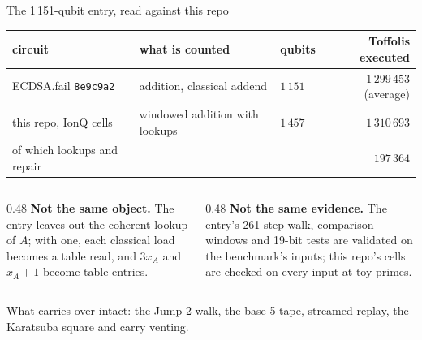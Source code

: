 \documentclass[aspectratio=169,11pt]{beamer}
\begin{document}
\begin{frame}{The 1\,151-qubit entry, read against this repo}
  \centering\footnotesize
  \renewcommand{\arraystretch}{1.15}
  \begin{tabular}{@{}lllr@{}}
    \toprule
    circuit & what is counted & qubits & Toffolis executed \\
    \midrule
    ECDSA.fail \texttt{8e9c9a2} & addition, classical addend & $1\,151$ & $1\,299\,453$ (average) \\
    this repo, IonQ cells & windowed addition with lookups & $1\,457$ & $1\,310\,693$ \\
    \quad of which lookups and repair & & & $197\,364$ \\
    \bottomrule
  \end{tabular}\par
  \vskip3mm
  \raggedright
  \begin{columns}[T]
    \begin{column}{0.48\textwidth}
      \small \textbf{Not the same object.} The entry leaves out the coherent lookup of $A$; with one, each classical load becomes a table read, and $3x_A$ and $x_A+1$ become table entries.
    \end{column}
    \begin{column}{0.48\textwidth}
      \small \textbf{Not the same evidence.} The entry's 261-step walk, comparison windows and 19-bit tests are validated on the benchmark's inputs; this repo's cells are checked on every input at toy primes.
    \end{column}
  \end{columns}
  \begin{takeaway}What carries over intact: the Jump-2 walk, the base-5 tape, streamed replay, the Karatsuba square and carry venting.\end{takeaway}
\end{frame}
\end{document}
